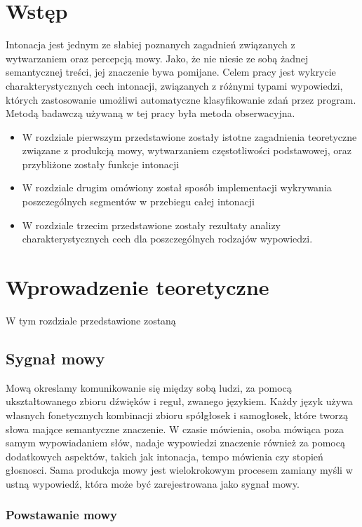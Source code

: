 \documentclass[a4paper,12 pt]{article}
\begin{document}
\section*{Wstęp}
Intonacja jest jednym ze słabiej poznanych zagadnień związanych z wytwarzaniem oraz percepcją mowy. Jako, że nie niesie ze sobą żadnej semantycznej treści, jej znaczenie bywa pomijane. 
\newline
Celem pracy jest wykrycie charakterystycznych cech intonacji, związanych z różnymi typami wypowiedzi, których zastosowanie umożliwi automatyczne klasyfikowanie zdań przez program. Metodą badawczą używaną w tej pracy była metoda obserwacyjna.
\begin{itemize}
\item{W rozdziale pierwszym przedstawione zostały istotne zagadnienia teoretyczne związane z produkcją mowy, wytwarzaniem częstotliwości podstawowej,
oraz przybliżone zostały funkcje intonacji}
\item{W rozdziale drugim omówiony został sposób implementacji wykrywania poszczególnych segmentów w przebiegu całej intonacji}
\item{W rozdziale trzecim przedstawione zostały rezultaty analizy charakterystycznych cech dla poszczególnych rodzajów wypowiedzi.}
\end{itemize}
\newpage
\section{Wprowadzenie teoretyczne}
W tym rozdziale przedstawione zostaną
\subsection{Sygnał mowy}
Mową okreslamy komunikowanie się między sobą ludzi, za pomocą ukształtowanego zbioru dźwięków i reguł, zwanego językiem. Każdy język używa własnych fonetycznych kombinacji zbioru spółgłosek i samogłosek, które tworzą słowa mające semantyczne znaczenie. W czasie mówienia, osoba mówiąca poza samym wypowiadaniem słów, nadaje wypowiedzi znaczenie również za pomocą dodatkowych aspektów, takich jak intonacja, tempo mówienia czy stopień głosnosci.
Sama produkcja mowy jest wielokrokowym procesem zamiany myśli w ustną wypowiedź, która może być zarejestrowana jako sygnał mowy.


 
\subsubsection{Powstawanie mowy}
\end{document}
